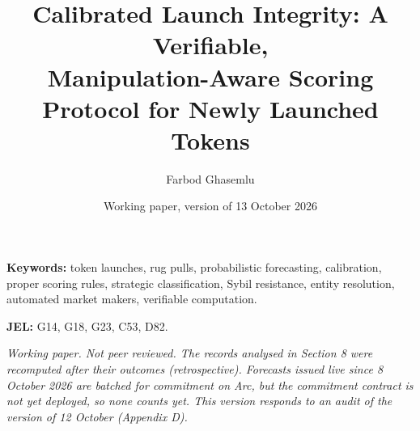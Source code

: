 \documentclass[11pt,a4paper]{article}
\title{Calibrated Launch Integrity: A Verifiable,\\ Manipulation-Aware Scoring Protocol for Newly Launched Tokens}
\author[1]{Farbod Ghasemlu}
\affil[1]{Drydock Org \\ \texttt{farbodghasemlu@outlook.com} \\ ORCID: 0009-0009-2303-5672}
\date{Working paper, version of 13 October 2026}
\theoremstyle{plain}
\theoremstyle{definition}
\begin{document}
\maketitle

\begin{abstract}

\end{abstract}

\medskip
\noindent\textbf{Keywords:} token launches, rug pulls, probabilistic forecasting, calibration, proper scoring rules, strategic classification, Sybil resistance, entity resolution, automated market makers, verifiable computation.

\noindent\textbf{JEL:} G14, G18, G23, C53, D82.

\medskip
\noindent\emph{Working paper. Not peer reviewed. The records analysed in Section 8 were recomputed after their outcomes (retrospective). Forecasts issued live since 8 October 2026 are batched for commitment on Arc, but the commitment contract is not yet deployed, so none counts yet. This version responds to an audit of the version of 12 October (Appendix D).}


\end{document}
